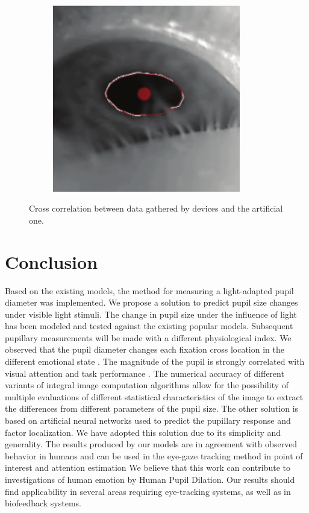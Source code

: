 \documentclass[USenglish,twocolumn]{article}
\begin{document}
\begin{figure}[H]
	\begin{subfigure}[b]{0.45\textwidth}
		\centering
		\includegraphics[width=0.9\textwidth]{img/PupilLab/6.png}
		\caption{}
		\label{fig:crossCorrelation3}
	\end{subfigure}
	\caption{Cross correlation between data gathered by devices and the artificial one.}	
	\label{fig:crossCorrelation}
\end{figure}


\section{Conclusion}
Based on the existing models, the method for measuring a light-adapted pupil diameter was implemented. We propose a solution to predict pupil size changes under visible light stimuli. The change in pupil size under the influence of light has been modeled and tested against the existing popular models. 
Subsequent pupillary measurements will be made with a different physiological index. We observed that the pupil diameter changes each fixation cross location in the different emotional state \cite{Raiturkar}. The magnitude of the pupil is strongly correlated with visual attention and task performance \cite{Ebitz}. The numerical accuracy of different variants of integral image computation algorithms allow for the possibility of multiple evaluations of different statistical characteristics of the image \cite{Puchala} to extract the differences from different parameters of the pupil size. 
The other solution is based on artificial neural networks \cite{Garbaa} \cite{Lipinski} used to predict the pupillary response and factor localization. We have adopted this solution due to its simplicity and generality. The results produced by our models are in agreement with observed behavior in humans and can be used in the eye-gaze tracking method in point of interest and attention estimation
We believe that this work can contribute to investigations of human emotion by Human Pupil Dilation. Our results should find applicability in several areas requiring eye-tracking systems, as well as in biofeedback systems. 
\end{document}
